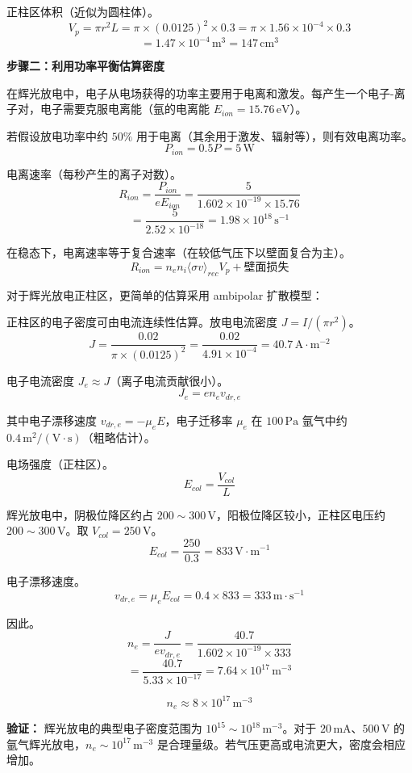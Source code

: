 正柱区体积（近似为圆柱体）。
\[
    V_p = \pi r^2 L = \pi \times (0.0125)^2 \times 0.3 = \pi \times 1.56\times10^{-4} \times 0.3
\]
\[
    = 1.47\times10^{-4}\,\mathrm{m^3} = 147\,\mathrm{cm^3}
\]

\textbf{步骤二：利用功率平衡估算密度}

在辉光放电中，电子从电场获得的功率主要用于电离和激发。每产生一个电子-离子对，电子需要克服电离能（氩的电离能 $E_{ion} = 15.76\,\mathrm{eV}$）。

若假设放电功率中约 $50\%$ 用于电离（其余用于激发、辐射等），则有效电离功率。
\[
    P_{ion} = 0.5 P = 5\,\mathrm{W}
\]

电离速率（每秒产生的离子对数）。
\[
    R_{ion} = \frac{P_{ion}}{e E_{ion}} = \frac{5}{1.602\times10^{-19} \times 15.76}
\]
\[
    = \frac{5}{2.52\times10^{-18}} = 1.98\times10^{18}\,\mathrm{s^{-1}}
\]

在稳态下，电离速率等于复合速率（在较低气压下以壁面复合为主）。
\[
    R_{ion} = n_e n_i \langle\sigma v\rangle_{rec} V_p + \text{壁面损失}
\]

对于辉光放电正柱区，更简单的估算采用 ambipolar 扩散模型：

正柱区的电子密度可由电流连续性估算。放电电流密度 $J = I / (\pi r^2)$。
\[
    J = \frac{0.02}{\pi \times (0.0125)^2} = \frac{0.02}{4.91\times10^{-4}} = 40.7\,\mathrm{A\cdot m^{-2}}
\]

电子电流密度 $J_e \approx J$（离子电流贡献很小）。
\[
    J_e = e n_e v_{dr,e}
\]

其中电子漂移速度 $v_{dr,e} = -\mu_e E$，电子迁移率 $\mu_e$ 在 $100\,\mathrm{Pa}$ 氩气中约 $0.4\,\mathrm{m^2/(V\cdot s)}$（粗略估计）。

电场强度（正柱区）。
\[
    E_{col} = \frac{V_{col}}{L}
\]

辉光放电中，阴极位降区约占 $200\sim300\,\mathrm{V}$，阳极位降区较小，正柱区电压约 $200\sim300\,\mathrm{V}$。取 $V_{col} = 250\,\mathrm{V}$。
\[
    E_{col} = \frac{250}{0.3} = 833\,\mathrm{V\cdot m^{-1}}
\]

电子漂移速度。
\[
    v_{dr,e} = \mu_e E_{col} = 0.4 \times 833 = 333\,\mathrm{m\cdot s^{-1}}
\]

因此。
\[
    n_e = \frac{J}{e v_{dr,e}} = \frac{40.7}{1.602\times10^{-19} \times 333}
\]
\[
    = \frac{40.7}{5.33\times10^{-17}} = 7.64\times10^{17}\,\mathrm{m^{-3}}
\]

\[
    \boxed{n_e \approx 8\times10^{17}\,\mathrm{m^{-3}}}
\]

\textbf{验证：} 辉光放电的典型电子密度范围为 $10^{15}\sim10^{18}\,\mathrm{m^{-3}}$。对于 $20\,\mathrm{mA}$、$500\,\mathrm{V}$ 的氩气辉光放电，$n_e\sim 10^{17}\,\mathrm{m^{-3}}$ 是合理量级。若气压更高或电流更大，密度会相应增加。

